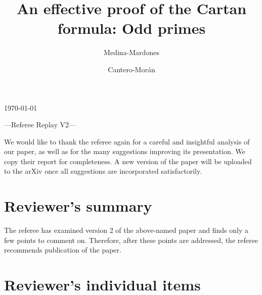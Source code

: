 \documentclass{amsart}
\title[Referee reply]{An effective proof of the Cartan formula: Odd primes}
\author{Medina-Mardones}
\author{Cantero-Mor\'an}
\begin{document}
\noindent\today

\begin{center}
	\Large{---Referee Replay V2---}
	\bigskip
\end{center}

\maketitle

\noindent We would like to thank the referee again for a careful and insightful analysis of our paper, as well as for the many suggestions improving its presentation.
We copy their report for completeness.
A new version of the paper will be uploaded to the arXiv once all suggestions are incorporated satisfactorily.

\section{Reviewer's summary}

\noindent The referee has examined version 2 of the above-named paper and finds only a few points to comment on.
Therefore, after these points are addressed, the referee recommends publication of the paper.

\section{Reviewer's individual items}
\end{document}
